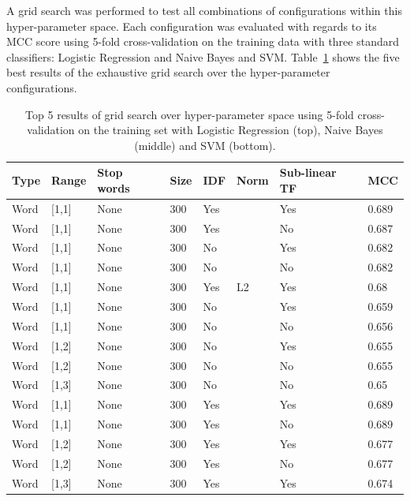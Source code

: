 A grid search was performed to test all combinations of configurations within this hyper-parameter space. Each configuration was evaluated with regards to its \gls{MCC} score using 5-fold cross-validation on the training data with three standard classifiers: Logistic Regression and Naive Bayes and SVM.
Table~\ref{tab:Ngram Grid Search} shows the five best results of the exhaustive grid search over the hyper-parameter configurations.

\begin{table}[h]
  \begin{center}
  \begin{tabular}{ l l l l l l l l }
    \toprule
    Type & Range & Stop words & Size & IDF & Norm & Sub-linear TF & \gls{MCC} \\
    \midrule
    Word & [1,1] & None & 300 & Yes &  & Yes & 0.689 \\
    Word & [1,1] & None & 300 & Yes &  & No & 0.687 \\
    Word & [1,1] & None & 300 & No &  & Yes & 0.682 \\
    Word & [1,1] & None & 300 & No &  & No & 0.682 \\
    Word & [1,1] & None & 300 & Yes & L2 & Yes & 0.68 \\
    \midrule
    Word & [1,1] & None & 300 & No & & Yes & 0.659  \\
    Word & [1,1] & None & 300 & No & & No & 0.656 \\
    Word & [1,2] & None & 300 & No & & Yes & 0.655 \\
    Word & [1,2] & None & 300 & No & & No & 0.655 \\
    Word & [1,3] & None & 300 & No & & No & 0.65 \\
    \midrule
    Word & [1,1] & None & 300 & Yes & & Yes & 0.689 \\
    Word & [1,1] & None & 300 & Yes & & No  & 0.689 \\
    Word & [1,2] & None & 300 & Yes & & Yes & 0.677 \\
    Word & [1,2] & None & 300 & Yes & & No  & 0.677 \\
    Word & [1,3] & None & 300 & Yes & & Yes & 0.674 \\
    \bottomrule
  \end{tabular}
  \caption{Top 5 results of grid search over hyper-parameter space using 5-fold cross-validation on the training set with Logistic Regression (top), Naive Bayes (middle) and SVM (bottom).}
\label{tab:Ngram Grid Search}
\end{center}
\end{table}

